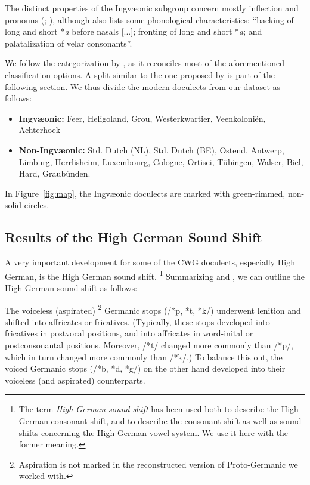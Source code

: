 \documentclass[a4paper]{article}
\begin{document}
The distinct properties of the Ingv\ae{}onic subgroup
concern mostly inflection and pronouns
(\citet{stiles2013pan-west}; \citet[pp. 7-8]{harbert2007germanic}),
although \citet{stiles2013pan-west} also lists some phonological characteristics:
``backing of long and short *\textit{a} before nasals [...];
fronting of long and short *\textit{a};
and palatalization of velar consonants''.

We follow the categorization by \citet{harbert2007germanic}, 
as it reconciles most of the aforementioned classification options.
A split similar to the one proposed by \citet{sonderegger1979grundzuege}
is part of the following section.
We thus divide the modern doculects from our dataset as follows:

\begin{itemize}
\item 
\textbf{Ingv\ae{}onic:}
Feer, Heligoland, Grou,
Westerkwartier, Veenkoloni\"{e}n, Achterhoek

\item
\textbf{Non-Ingv\ae{}onic:}
Std. Dutch (NL), Std. Dutch (BE), Ostend, Antwerp, Limburg,
Herrlisheim, Luxembourg, Cologne,
Ortisei, T\"{u}bingen, Walser, Biel, Hard, Graub\"{u}nden.
\end{itemize}

In Figure~\ref{fig:map}, the Ingv\ae{}onic doculects
are marked with green-rimmed, non-solid circles.

\subsection{Results of the High German Sound Shift}

A very important development for some of the CWG doculects,
especially High German, is the High German sound shift.%
\footnote{%
The term \textit{High German sound shift} has been used both
to describe the High German consonant shift,
and to describe the consonant shift as well as
sound shifts concerning the High German vowel system.
We use it here with the former meaning.
}
Summarizing \citet[pp. 47--48]{harbert2007germanic}
and \citet[pp. 62--64]{koenig2015dtv},
we can outline the High German sound shift as follows:

The voiceless (aspirated)%
\footnote{%
Aspiration is not marked in the reconstructed version of Proto-Germanic
we worked with.
}
Germanic stops (/*p, *t, *k/)
underwent lenition and shifted into affricates or fricatives.
(Typically, these stops developed into fricatives in postvocal positions,
and into affricates in word-inital or postconsonantal positions.
Moreover, /*t/ changed more commonly than /*p/,
which in turn changed more commonly than /*k/.)
To balance this out,
the voiced Germanic stops (/*b, *d, *g/) on the other hand
developed into their voiceless (and aspirated) counterparts.
\end{document}
